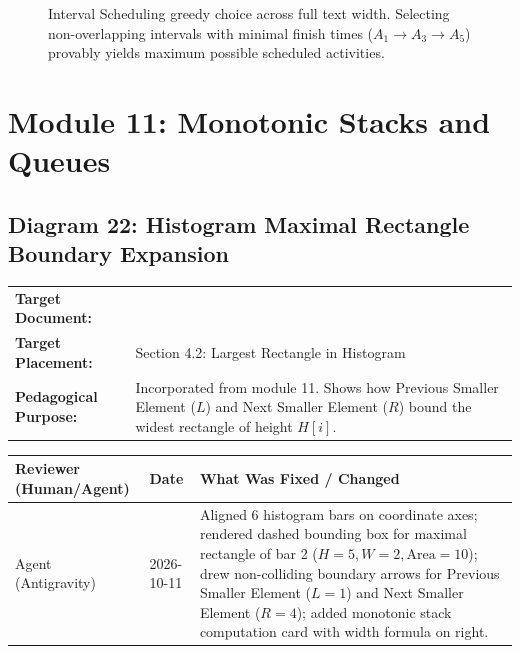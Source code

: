 \documentclass[11pt,a4paper]{article}
\newcommand{\breadcrumb}[3]{
    \par\vspace{0.15cm}
    \noindent\begin{tabularx}{\textwidth}{|l|X|}
    \hline
    \textbf{Target Document:} & \texttt{\detokenize{#1}} \\
    \textbf{Target Placement:} & #2 \\
    \textbf{Pedagogical Purpose:} & #3 \\
    \hline
    \end{tabularx}
    \vspace{0.15cm}\par
}
\newcommand{\diagramaudit}[3]{
    \par\vspace{0.12cm}
    \noindent\begin{tabularx}{\textwidth}{|l|l|>{\raggedright\arraybackslash}X|}
    \hline
    \textbf{Reviewer (Human/Agent)} & \textbf{Date} & \textbf{What Was Fixed / Changed} \\ \hline
    #1 & #2 & #3 \\ \hline
    \end{tabularx}
    \vspace{0.12cm}\par
}
\begin{document}
\begin{figure}[htbp]
\caption{Interval Scheduling greedy choice across full text width. Selecting non-overlapping intervals with minimal finish times ($A_1 \to A_3 \to A_5$) provably yields maximum possible scheduled activities.}
\end{figure}

\newpage
\section{Module 11: Monotonic Stacks and Queues}

\subsection{Diagram 22: Histogram Maximal Rectangle Boundary Expansion}

\breadcrumb{11.monotonic_stacks_and_queues.tex}{Section 4.2: Largest Rectangle in Histogram}{Incorporated from module 11. Shows how Previous Smaller Element ($L$) and Next Smaller Element ($R$) bound the widest rectangle of height $H[i]$.}

\diagramaudit{Agent (Antigravity)}{2026-10-11}{Aligned 6 histogram bars on coordinate axes; rendered dashed bounding box for maximal rectangle of bar 2 ($H=5, W=2, \text{Area}=10$); drew non-colliding boundary arrows for Previous Smaller Element ($L=1$) and Next Smaller Element ($R=4$); added monotonic stack computation card with width formula on right.}
\end{document}
